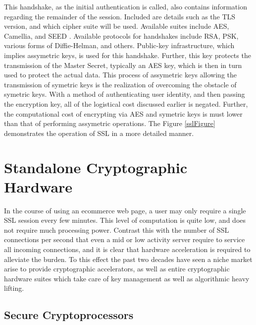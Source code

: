 \documentclass[journal]{IEEEtran}
\begin{document}
This handshake, as the initial authentication is called, also contains information regarding the remainder of the session.  Included are details such as the TLS version, and which cipher suite will be used.  Available suites include AES, Camellia, and SEED \cite{tlsRFC}.  Available protocols for handshakes include RSA, PSK, various forms of Diffie-Helman, and others. Public-key infrastructure, which implies assymetric keys, is used for this handshake.  Further, this key protects the transmission of the Master Secret, typically an AES key, which is then in turn used to protect the actual data.  This process of assymetric keys allowing the transmission of symetric keys is the realization of overcoming the obstacle of symetric keys.  With a method of authenticating user identity, and then passing the encryption key, all of the logistical cost discussed earlier is negated.  Further, the computational cost of encrypting via AES and symetric keys is must lower than that of performing assymetric operations.  The Figure \ref{sslFigure} demonstrates the operation of SSL in a more detailed manner.

\section{Standalone Cryptographic Hardware}

In the course of using an ecommerce web page, a user may only require a single SSL session every few minutes.  This level of computation is quite low, and does not require much processing power.  Contrast this with the number of SSL connections per second that even a mid or low activity server require to service all incoming connections, and it is clear that hardware acceleration is required to alleviate the burden.  To this effect the past two decades have seen a niche market arise to provide cryptographic accelerators, as well as entire cryptographic hardware suites which take care of key management as well as algorithmic heavy lifting.

\subsection{Secure Cryptoprocessors}
\end{document}
